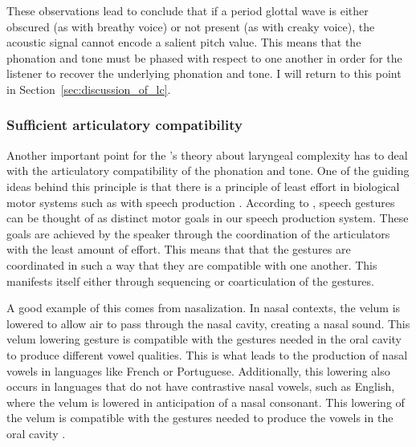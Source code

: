 These observations lead \citet{silvermanLaryngealComplexityOtomanguean1997} to conclude that if a period glottal wave is either obscured (as with breathy voice) or not present (as with creaky voice), the acoustic signal cannot encode a salient pitch value. This means that the phonation and tone must be phased with respect to one another in order for the listener to recover the underlying phonation and tone. I will return to this point in Section~\ref{sec:discussion_of_lc}.

\subsubsection{Sufficient articulatory compatibility}\label{sec:sufficient_articulatory_compatibility}

Another important point for the \citeauthor{silvermanLaryngealComplexityOtomanguean1997}'s theory about laryngeal complexity has to deal with the articulatory compatibility of the phonation and tone. One of the guiding ideas behind this principle is that there is a principle of least effort in biological motor systems such as with speech production \citep{lindblomEconomySpeechGestures1983}. According to \citet{lindblomEconomySpeechGestures1983}, speech gestures can be thought of as distinct motor goals in our speech production system. These goals are achieved by the speaker through the coordination of the articulators with the least amount of effort. This means that that the gestures are coordinated in such a way that they are compatible with one another. This manifests itself either through sequencing or coarticulation of the gestures.

A good example of this comes from nasalization. In nasal contexts, the velum is lowered to allow air to pass through the nasal cavity, creating a nasal sound. This velum lowering gesture is compatible with the gestures needed in the oral cavity to produce different vowel qualities. This is what leads to the production of nasal vowels in languages like French or Portuguese. Additionally, this lowering also occurs in languages that do not have contrastive nasal vowels, such as English, where the velum is lowered in anticipation of a nasal consonant. This lowering of the velum is compatible with the gestures needed to produce the vowels in the oral cavity \citep[e.g.,][]{ohalaPhoneticExplanationsNasal1975,chenAcousticCorrelatesEnglish1997,stylerAcousticalPerceptualFeatures2015}.

